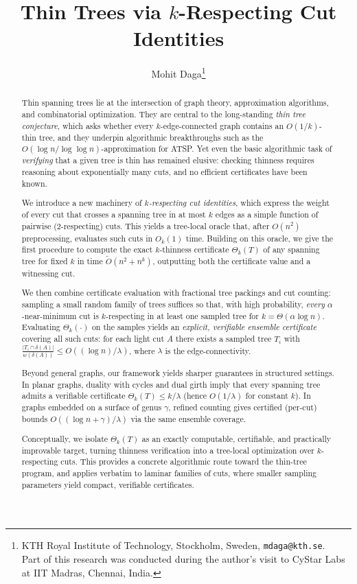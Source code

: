\documentclass[11pt,letterpaper]{article}
\title{Thin Trees via $k$-Respecting Cut Identities}
\author{Mohit Daga\thanks{KTH Royal Institute of Technology, Stockholm, Sweden, \texttt{mdaga@kth.se}.\\
Part of this research was conducted during the author’s visit to CyStar Labs at IIT Madras, Chennai, India.}}
\begin{document}
	
	\begin{titlepage}
		\maketitle {}
		
\begin{abstract}
Thin spanning trees lie at the intersection of graph theory, approximation
algorithms, and combinatorial optimization. They are central to the long-standing
\emph{thin tree conjecture}, which asks whether every $k$-edge-connected graph
contains an $O(1/k)$-thin tree, and they underpin algorithmic breakthroughs such
as the $O(\log n/\log\log n)$-approximation for ATSP. Yet even the basic
algorithmic task of \emph{verifying} that a given tree is thin has remained
elusive: checking thinness requires reasoning about exponentially many cuts, and
no efficient certificates have been known.

We introduce a new machinery of \emph{$k$-respecting cut identities}, which
express the weight of every cut that crosses a spanning tree in at most $k$
edges as a simple function of pairwise ($2$-respecting) cuts. This yields
a tree-local oracle that, after $O(n^2)$ preprocessing, evaluates such cuts in
$O_k(1)$ time. Building on this oracle, we give the first procedure to compute
the exact $k$-thinness certificate $\Theta_k(T)$ of any spanning tree for fixed $k$
in time $\tilde O(n^2+n^k)$, outputting both the certificate value and a
witnessing cut. 

We then combine certificate evaluation with fractional tree packings and cut
counting: sampling a small random family of trees suffices so that, with high
probability, \emph{every} $\alpha$-near-minimum cut is $k$-respecting in at least
one sampled tree for $k=\Theta(\alpha\log n)$. Evaluating $\Theta_k(\cdot)$ on
the samples yields an \emph{explicit, verifiable ensemble certificate} covering
all such cuts: for each light cut $A$ there exists a sampled tree $T_i$ with
$\frac{|T_i\cap\delta(A)|}{w(\delta(A))}\le O((\log n)/\lambda)$, where $\lambda$
is the edge-connectivity.

Beyond general graphs, our framework yields sharper guarantees in structured
settings. In planar graphs, duality with cycles and dual girth imply that
every spanning tree admits a verifiable certificate $\Theta_k(T)\le k/\lambda$
(hence $O(1/\lambda)$ for constant $k$). In graphs embedded on a surface of genus
$\gamma$, refined counting gives certified (per-cut) bounds
$O((\log n+\gamma)/\lambda)$ via the same ensemble coverage.

Conceptually, we isolate $\Theta_k(T)$ as an exactly computable, certifiable, and
practically improvable target, turning thinness verification into a tree-local
optimization over $k$-respecting cuts. This provides a concrete algorithmic route
toward the thin-tree program, and applies verbatim to laminar families of cuts,
where smaller sampling parameters yield compact, verifiable certificates.
\end{abstract}
		
		\setcounter{tocdepth}{3}
		\newpage
		\tableofcontents
		\newpage
	\end{titlepage}
	
\end{document}
